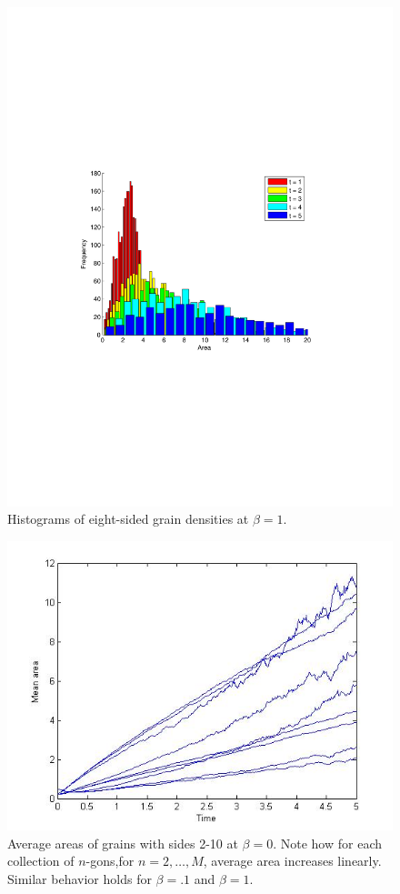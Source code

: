 \begin{figure}
\includegraphics[width=\textwidth]{histbetaonetier8.pdf}
\vspace{-130pt}
\caption{Histograms of eight-sided grain densities at $\beta = 1$.}\label{tierdens9}
\end{figure}

\begin{figure}
\begin{centering}
\includegraphics[width=.5\textwidth]{averageareas.jpg}
\caption{Average areas of grains with sides 2-10 at $\beta= 0$.  Note how for each collection of $n$-gons,for $n= 2, \dots, M$, average area increases linearly.  Similar behavior holds for $\beta= .1$ and $\beta= 1.$}\label{averagewhole}
\end{centering}
\end{figure}


